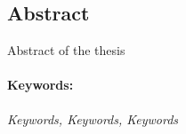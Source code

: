 \subsection*{Abstract}

Abstract of the thesis

\paragraph{Keywords:}
\textit{Keywords, Keywords, Keywords}
